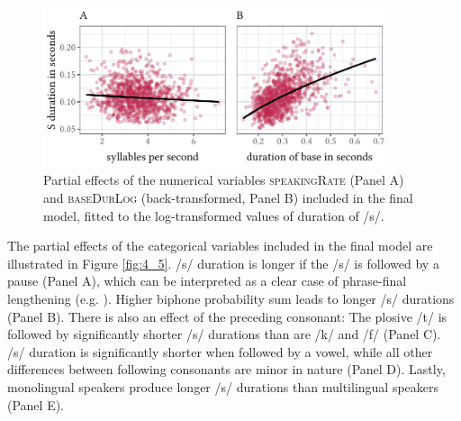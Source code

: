 \begin{figure}
    \centering
    \includegraphics[width=0.9\textwidth]{figures/fig4.4.pdf}
    \caption{Partial effects of the numerical variables \textsc{speakingRate} (Panel A) and \textsc{baseDurLog} (back-transformed, Panel B) included in the final model, fitted to the log-transformed values of duration of /s/.}
    \label{fig:4_4}
\end{figure}


The partial effects of the categorical variables included in the final model are illustrated in Figure \ref{fig:4_5}. /s/ duration is longer if the /s/ is followed by a pause (Panel A), which can be interpreted as a clear case of phrase-final lengthening (e.g. \cite{Cooper1981}). Higher biphone probability sum leads to longer /s/ durations (Panel B). There is also an effect of the preceding consonant: The plosive /t/ is followed by significantly shorter /s/ durations than are /k/ and /f/ (Panel C). /s/ duration is significantly shorter when followed by a vowel, while all other differences between following consonants are minor in nature (Panel D). Lastly, monolingual speakers produce longer /s/ durations than multilingual speakers (Panel E).

